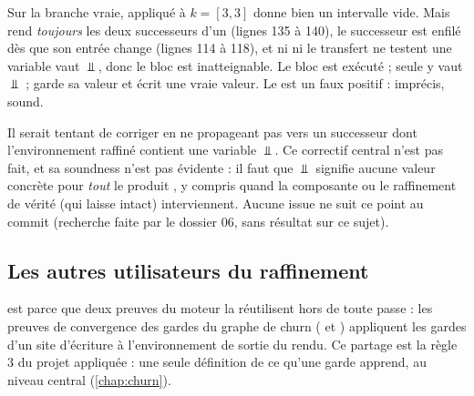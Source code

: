 
Sur la branche vraie,  appliqué à $k = [3,3]$ donne bien
un intervalle vide. Mais  rend \emph{toujours} les deux
successeurs d'un  (lignes 135 à 140), le successeur est enfilé
dès que son entrée change (lignes 114 à 118), et ni  ni le
transfert ne testent \og une variable vaut $\Bot$, donc le bloc est
inatteignable\fg. Le bloc est exécuté ; seule  y vaut $\Bot$ ;
 garde sa valeur et  écrit une vraie valeur. Le
\Warning{} est un faux positif : imprécis, sound.

\begin{piege}
  Il serait tentant de \og corriger\fg{} en ne propageant pas vers un
  successeur dont l'environnement raffiné contient une variable $\Bot$. Ce
  correctif central n'est pas fait, et sa soundness n'est pas évidente : il
  faut que $\Bot$ signifie \og aucune valeur concrète\fg{} pour \emph{tout}
  le produit , y compris quand la composante 
  ou le raffinement de vérité (qui laisse  intact) interviennent.
  Aucune issue ne suit ce point au commit \snapshotCommit{} (recherche faite
  par le dossier 06,  sans résultat sur ce sujet).
\end{piege}

\subsection{Les autres utilisateurs du raffinement}

 est  parce que deux preuves du
moteur la réutilisent hors de toute passe : les preuves de convergence des
gardes du graphe de churn ( et
) appliquent les gardes d'un site
d'écriture à l'environnement de sortie du rendu. Ce partage est la règle 3
du projet appliquée : une seule définition de ce qu'une garde apprend, au
niveau central (\cref{chap:churn}).

